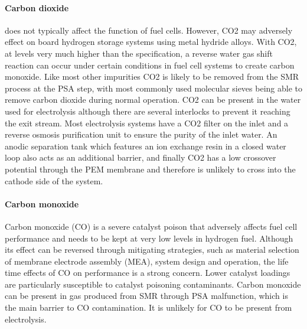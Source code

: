 \paragraph{Carbon dioxide} 
does not typically affect the function of fuel cells. However, CO2 may adversely effect on board hydrogen storage systems using metal hydride alloys. With CO2, at levels very much higher than the specification, a reverse water gas shift reaction can occur under certain conditions in fuel cell systems to create carbon monoxide.
Like most other impurities CO2 is likely to be removed from the SMR process at the PSA step, with most commonly used molecular sieves being able to remove carbon dioxide during normal operation.
CO2 can be present in the water used for electrolysis although there are several interlocks to prevent it reaching the exit stream. Most electrolysis systems have a CO2 filter on the inlet and a reverse osmosis purification unit to ensure the purity of the inlet water.  An anodic separation tank which features an ion exchange resin in a closed water loop also acts as an additional barrier, and finally CO2 has a low crossover potential through the PEM membrane and therefore is unlikely to cross into the cathode side of the system.

\paragraph{Carbon monoxide}
Carbon monoxide (CO) is a severe catalyst poison that adversely affects fuel cell performance and needs to be kept at very low levels in hydrogen fuel. Although its effect can be reversed through mitigating strategies, such as material selection of membrane electrode assembly (MEA), system design and operation, the life time effects of CO on performance is a strong concern. Lower catalyst loadings are particularly susceptible to catalyst poisoning contaminants.
Carbon monoxide can be present in gas produced from SMR through PSA malfunction, which is the main barrier to CO contamination. It is unlikely for CO to be present from electrolysis.

